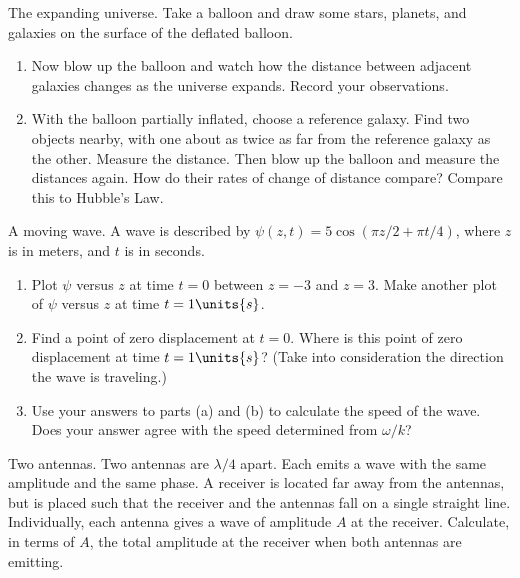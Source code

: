 \begin{aproblem}{The expanding universe.}  
  Take a balloon and draw some stars, planets, and galaxies on the
  surface of the deflated balloon.
  \begin{enumerate}
  \item Now blow up the balloon and watch how the distance between
    adjacent galaxies changes as the universe expands.  Record your
    observations.
  \item With the balloon partially inflated, choose a reference
    galaxy.  Find two objects nearby, with one about as twice as far
    from the reference galaxy as the other.  Measure the distance.
    Then blow up the balloon and measure the distances again.  How do
    their rates of change of distance compare?  Compare this to
    Hubble's Law.
  \end{enumerate}
\end{aproblem}


\begin{aproblem}{A moving wave.}
  A wave is described by $\psi(z,t) = 5 \cos\left(\pi z/2 + \pi
  t/4\right)$, where $z$ is in meters, and $t$ is in seconds.
  \begin{enumerate}
  \item Plot $\psi$ versus $z$ at time $t=0$ between $z = -3$ and $z =
    3$.  Make another plot of $\psi$ versus $z$ at time
    $t=1\units{s}$.
  \item Find a point of zero displacement at $t=0$.  Where is this
    point of zero displacement at time $t=1\units{s}$?  (Take into
    consideration the direction the wave is traveling.)
  \item Use your answers to parts (a) and (b) to calculate the speed
    of the wave.  Does your answer agree with the speed determined
    from $\omega/k$?
  \end{enumerate}
\end{aproblem}

\newpage

\begin{aproblem}{Two antennas.}
  Two antennas are $\lambda/4$ apart.  Each emits a wave with the same
  amplitude and the same phase.  A receiver is located far away from
  the antennas, but is placed such that the receiver and the antennas
  fall on a single straight line.  Individually, each antenna gives a
  wave of amplitude $A$ at the receiver.  Calculate, in terms of $A$,
  the total amplitude at the receiver when both antennas are emitting.
  \label{prob:TwoAntennas}
\end{aproblem}


